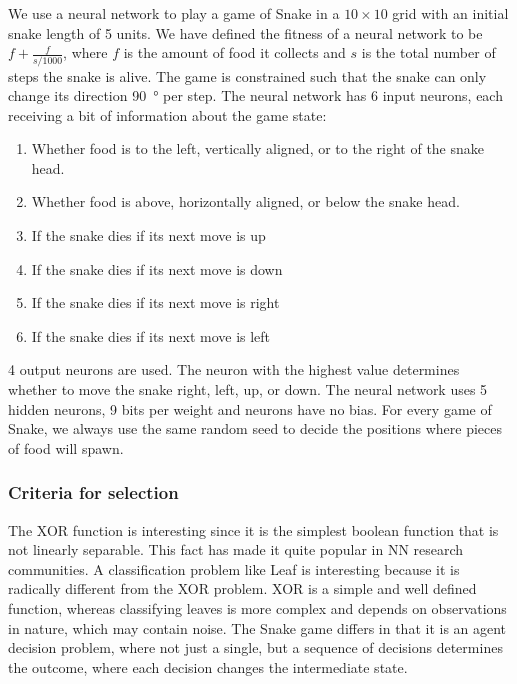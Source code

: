 We use a neural network to play a game of Snake in a $10\times10$ grid with an initial snake length of 5 units.
We have defined the fitness of a neural network to be $f + \frac{f}{s/1000}$,
where $f$ is the amount of food it collects and $s$ is the total number of steps the snake is alive. The game is constrained such that the snake can only change its direction \SI{90}{\degree} per step. The neural network has 6 input neurons, each receiving a bit of information about the game state:
\begin{enumerate}
  \item {} Whether food is to the left, vertically aligned, or to the right of the snake head.
  \item {} Whether food is above, horizontally aligned, or below the snake head.
  \item {} If the snake dies if its next move is up
  \item {} If the snake dies if its next move is down
  \item {} If the snake dies if its next move is right 
  \item {} If the snake dies if its next move is left
\end{enumerate}
4 output neurons are used. The neuron with the highest value determines whether to move the snake right, left, up, or down.
The neural network uses 5 hidden neurons, 9 bits per weight and neurons have no bias.
For every game of Snake, we always use the same random seed to decide the positions where pieces of food will spawn.

\subsubsection{Criteria for selection}
The XOR function is interesting since it is the simplest boolean function that is not linearly separable.
This fact has made it quite popular in NN research communities\cite{masterThesisGANN}.
A classification problem like Leaf is interesting because it is radically different from the XOR problem.
XOR is a simple and well defined function, whereas classifying leaves is more complex and depends on observations in nature, which may contain noise.
The Snake game differs in that it is an agent decision problem, where not just a single, but a sequence of decisions determines the outcome, where each decision changes the intermediate state.
